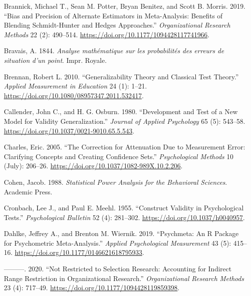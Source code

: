 \documentclass[
  letterpaper,
  DIV=11,
  numbers=noendperiod]{scrreprt}
\newlength{\cslhangindent}
\newlength{\cslentryspacingunit} %
\newenvironment{CSLReferences}[2] %
 {%
  \setlength{\parindent}{0pt}
  \ifodd #1
  \let\oldpar\par
  \def\par{\hangindent=\cslhangindent\oldpar}
  \fi
  \setlength{\parskip}{#2\cslentryspacingunit}
 }%
 {}
\begin{document}
\begin{CSLReferences}{1}{0}
\leavevmode{}%
Brannick, Michael T., Sean M. Potter, Bryan Benitez, and Scott B.
Morris. 2019. {``Bias and Precision of Alternate Estimators in
Meta-Analysis: Benefits of Blending Schmidt-Hunter and Hedges
Approaches.''} \emph{Organizational Research Methods} 22 (2): 490--514.
\url{https://doi.org/10.1177/1094428117741966}.

\leavevmode{}%
Bravais, A. 1844. \emph{Analyse mathématique sur les probabilités des
erreurs de situation d'un point}. Impr. Royale.

\leavevmode{}%
Brennan, Robert L. 2010. {``Generalizability Theory and Classical Test
Theory.''} \emph{Applied Measurement in Education} 24 (1): 1--21.
\url{https://doi.org/10.1080/08957347.2011.532417}.

\leavevmode{}%
Callender, John C., and H. G. Osburn. 1980. {``Development and Test of a
New Model for Validity Generalization.''} \emph{Journal of Applied
Psychology} 65 (5): 543--58.
\url{https://doi.org/10.1037/0021-9010.65.5.543}.

\leavevmode{}%
Charles, Eric. 2005. {``The Correction for Attenuation Due to
Measurement Error: Clarifying Concepts and Creating Confidence Sets.''}
\emph{Psychological Methods} 10 (July): 206--26.
\url{https://doi.org/10.1037/1082-989X.10.2.206}.

\leavevmode{}%
Cohen, Jacob. 1988. \emph{Statistical Power Analysis for the Behavioral
Sciences}. Academic Press.

\leavevmode{}%
Cronbach, Lee J., and Paul E. Meehl. 1955. {``Construct Validity in
Psychological Tests.''} \emph{Psychological Bulletin} 52 (4): 281--302.
\url{https://doi.org/10.1037/h0040957}.

\leavevmode{}%
Dahlke, Jeffrey A., and Brenton M. Wiernik. 2019. {``Psychmeta: An R
Package for Psychometric Meta-Analysis.''} \emph{Applied Psychological
Measurement} 43 (5): 415--16.
\url{https://doi.org/10.1177/0146621618795933}.

\leavevmode{}%
---------. 2020. {``Not Restricted to Selection Research: Accounting for
Indirect Range Restriction in Organizational Research.''}
\emph{Organizational Research Methods} 23 (4): 717--49.
\url{https://doi.org/10.1177/1094428119859398}.


\end{CSLReferences}
\end{document}
